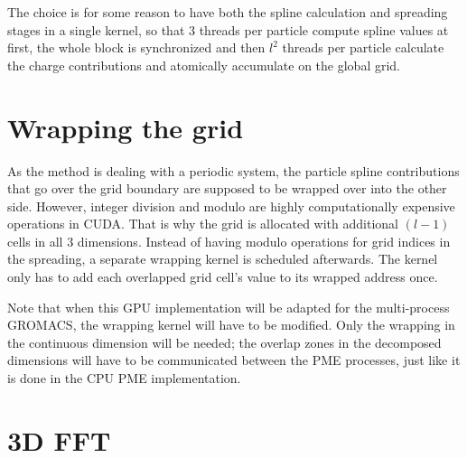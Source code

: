 \documentclass[12pt,a4paper]{report}
\newcommand{\draft}[1]{#1}
\begin{document}
The choice is \draft{for some reason} to have both the spline calculation and spreading stages in a single kernel, so that 3 threads per particle compute spline values at first, the whole block is synchronized and then $l^2$ threads per particle calculate the charge contributions and atomically accumulate on the global grid. 



\section{Wrapping the grid}
As the method is dealing with a periodic system, the particle spline contributions that go over the grid boundary are supposed to be wrapped over into the other side.
However, integer division and modulo are highly computationally expensive operations in CUDA. %
That is why the grid is allocated with additional $(l-1)$ cells in all 3 dimensions. Instead of having modulo operations for grid indices in the spreading, 
a separate wrapping kernel is scheduled afterwards. The kernel only has to add each overlapped grid cell's value to its wrapped address once. 


Note that when this GPU implementation will be adapted for the multi-process GROMACS, the wrapping kernel will have to be modified. Only the wrapping in the continuous dimension will be needed; the overlap zones in the decomposed dimensions will have to be communicated between the PME processes, just like it is done in the CPU PME implementation. 

\section{3D FFT} \label{FFTimpl}
\end{document}
